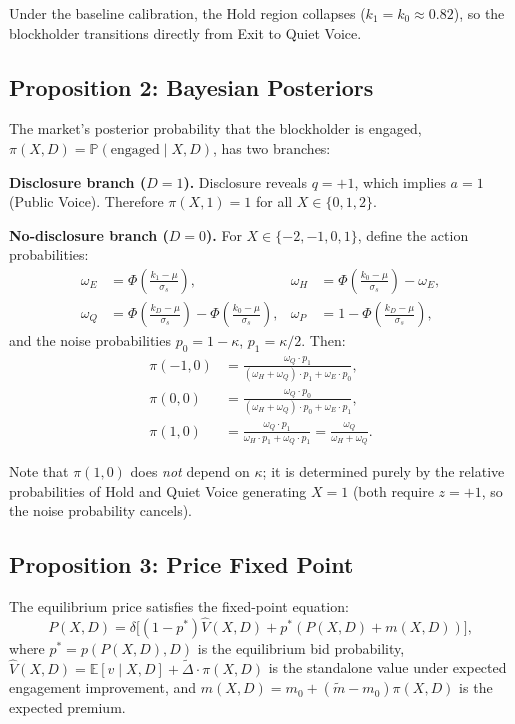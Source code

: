 \documentclass[11pt,a4paper]{article}
\newcommand{\E}{\mathbb{E}}
\newcommand{\PP}{\mathbb{P}}
\newcommand{\1}{\mathbf{1}}
\begin{document}
Under the baseline calibration, the Hold region collapses
($k_1 = k_0 \approx 0.82$), so the blockholder transitions directly
from Exit to Quiet Voice.

\subsection{Proposition 2: Bayesian Posteriors}

The market's posterior probability that the blockholder is engaged,
$\pi(X, D) = \PP(\text{engaged} \mid X, D)$, has two branches:

\textbf{Disclosure branch ($D=1$).}
Disclosure reveals $q = +1$, which implies $a = 1$ (Public Voice).
Therefore $\pi(X, 1) = 1$ for all $X \in \{0, 1, 2\}$.

\textbf{No-disclosure branch ($D=0$).}
For $X \in \{-2, -1, 0, 1\}$, define the action probabilities:
\begin{align}
  \omega_E &= \Phi\!\left(\frac{k_1 - \mu}{\sigma_s}\right),
  &
  \omega_H &= \Phi\!\left(\frac{k_0 - \mu}{\sigma_s}\right) - \omega_E,
  \\
  \omega_Q &= \Phi\!\left(\frac{k_D - \mu}{\sigma_s}\right)
    - \Phi\!\left(\frac{k_0 - \mu}{\sigma_s}\right),
  &
  \omega_P &= 1 - \Phi\!\left(\frac{k_D - \mu}{\sigma_s}\right),
\end{align}
and the noise probabilities $p_0 = 1 - \kappa$, $p_1 = \kappa/2$.
Then:
\begin{align}
  \pi(-1, 0) &= \frac{\omega_Q \cdot p_1}
    {(\omega_H + \omega_Q) \cdot p_1 + \omega_E \cdot p_0}, \\[4pt]
  \pi(0, 0) &= \frac{\omega_Q \cdot p_0}
    {(\omega_H + \omega_Q) \cdot p_0 + \omega_E \cdot p_1}, \\[4pt]
  \pi(1, 0) &= \frac{\omega_Q \cdot p_1}
    {\omega_H \cdot p_1 + \omega_Q \cdot p_1}
    = \frac{\omega_Q}{\omega_H + \omega_Q}.
\end{align}

Note that $\pi(1,0)$ does \emph{not} depend on $\kappa$; it is
determined purely by the relative probabilities of Hold and Quiet Voice
generating $X=1$ (both require $z = +1$, so the noise probability cancels).

\subsection{Proposition 3: Price Fixed Point}

The equilibrium price satisfies the fixed-point equation:
\[
P(X,D) = \delta \bigl[ (1 - p^*) \hat{V}(X,D) + p^* (P(X,D) + m(X,D)) \bigr],
\]
where $p^* = p(P(X,D), D)$ is the equilibrium bid probability,
$\hat{V}(X,D) = \E[v \mid X, D] + \tilde{\Delta} \cdot \pi(X,D)$
is the standalone value under expected engagement improvement, and
$m(X,D) = m_0 + (\tilde{m} - m_0)\pi(X,D)$ is the expected premium.
\end{document}

